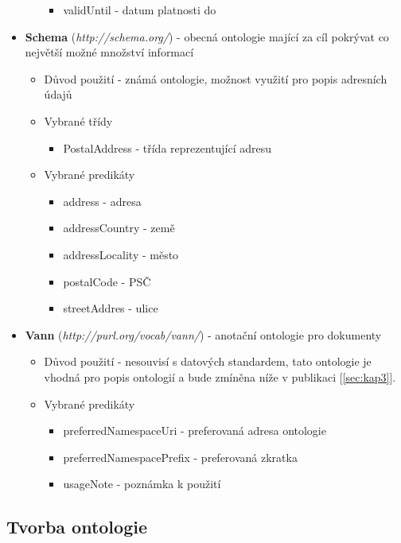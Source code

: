 \begin{itemize}
\begin{itemize}
\begin{itemize}
		\item validUntil - datum platnosti do
		\end{itemize}
	\end{itemize}
\item \textbf{Schema} (\textit{http://schema.org/}) - obecná ontologie mající za cíl pokrývat co největší možné množství informací
	\begin{itemize}
	\item Důvod použití - známá ontologie, možnost využití pro popis adresních údajů 
	\item Vybrané třídy 
		\begin{itemize}
		\item PostalAddress - třída reprezentující adresu 
		\end{itemize}
	\item Vybrané predikáty
		\begin{itemize}
		\item address - adresa
		\item addressCountry - země
		\item addressLocality - město
		\item postalCode - PSČ
		\item streetAddres - ulice
		\end{itemize}
	\end{itemize}
\item \textbf{Vann} (\textit{http://purl.org/vocab/vann/}) - anotační ontologie pro dokumenty 
	\begin{itemize}
	\item Důvod použití - nesouvisí s datových standardem, tato ontologie je vhodná pro popis ontologií a bude zmíněna níže v publikaci [\ref{sec:kap3}].
	\item Vybrané predikáty
		\begin{itemize}
		\item preferredNamespaceUri - preferovaná adresa ontologie
		\item preferredNamespacePrefix - preferovaná zkratka
		\item usageNote - poznámka k použití
		\end{itemize}
	\end{itemize}

\end{itemize}

\subsection{Tvorba ontologie}

